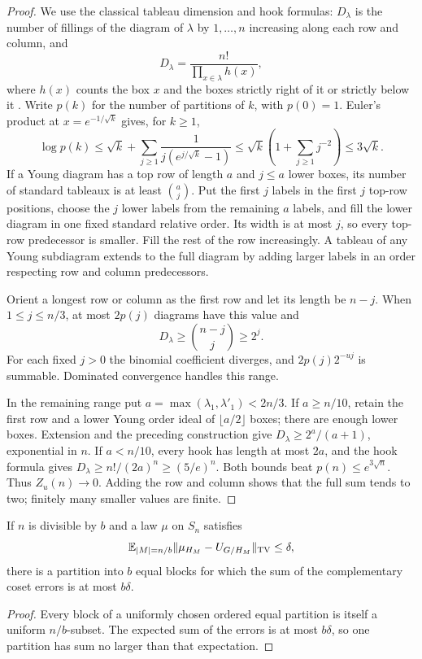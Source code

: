 \begin{proof}
We use the classical tableau dimension and hook formulas: $D_\lambda$ is the number of fillings of the diagram of $\lambda$ by $1,\ldots,n$ increasing along each row and column, and
\[D_\lambda=\frac{n!}{\prod_{x\in\lambda}h(x)},\]
where $h(x)$ counts the box $x$ and the boxes strictly right of it or strictly below it \cite{frame-robinson-thrall,James1978}. Write $p(k)$ for the number of partitions of $k$, with $p(0)=1$. Euler's product at $x=e^{-1/\sqrt{k}}$ gives, for $k\ge1$,
\[
 \log p(k)\le\sqrt{k}+\sum_{j\ge1}\frac1{j(e^{j/\sqrt{k}}-1)}
 \le\sqrt{k}\left(1+\sum_{j\ge1}j^{-2}\right)\le3\sqrt{k}.
\]
If a Young diagram has a top row of length $a$ and $j\le a$ lower boxes, its number of standard tableaux is at least $\binom aj$. Put the first $j$ labels in the first $j$ top-row positions, choose the $j$ lower labels from the remaining $a$ labels, and fill the lower diagram in one fixed standard relative order. Its width is at most $j$, so every top-row predecessor is smaller. Fill the rest of the row increasingly. A tableau of any Young subdiagram extends to the full diagram by adding larger labels in an order respecting row and column predecessors.

Orient a longest row or column as the first row and let its length be $n-j$. When $1\le j\le n/3$, at most $2p(j)$ diagrams have this value and
\[
 D_\lambda\ge\binom{n-j}{j}\ge2^j.
\]
For each fixed $j>0$ the binomial coefficient diverges, and $2p(j)2^{-uj}$ is summable. Dominated convergence handles this range.

In the remaining range put $a=\max(\lambda_1,\lambda'_1)<2n/3$. If $a\ge n/10$, retain the first row and a lower Young order ideal of $\lfloor a/2\rfloor$ boxes; there are enough lower boxes. Extension and the preceding construction give $D_\lambda\ge2^a/(a+1)$, exponential in $n$. If $a<n/10$, every hook has length at most $2a$, and the hook formula gives $D_\lambda\ge n!/(2a)^n\ge(5/e)^n$. Both bounds beat $p(n)\le e^{3\sqrt n}$. Thus $Z_u(n)\to0$. Adding the row and column shows that the full sum tends to two; finitely many smaller values are finite.
\end{proof}

\begin{lemma}\label{l:partition-selection}
If $n$ is divisible by $b$ and a law $\mu$ on $S_n$ satisfies
\[
 \mathbb E_{|M|=n/b}\|\mu_{H_M}-U_{G/H_M}\|_{\mathrm{TV}}\le\delta,
\]
there is a partition into $b$ equal blocks for which the sum of the complementary coset errors is at most $b\delta$.
\end{lemma}
\begin{proof}
Every block of a uniformly chosen ordered equal partition is itself a uniform $n/b$-subset. The expected sum of the errors is at most $b\delta$, so one partition has sum no larger than that expectation.
\end{proof}

